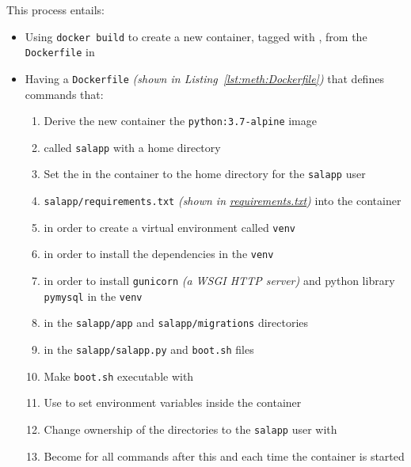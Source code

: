 \begin{enumerate}[leftmargin=0em,label=\protect\listlabelcircle{\arabic*}]
\begin{enumerate}[label=\Roman*~\textcolor{light-gray}{|}]
        This process entails:
        \begin{itemize}
          \item Using \texttt{docker build} to create a new container, tagged with , from the \texttt{Dockerfile} in 
          \item Having a \texttt{Dockerfile} \textit{(shown in Listing~\ref{lst:meth:Dockerfile})} that defines commands that:
            \begin{enumerate}[label=\textcolor{deep-gray}{\roman*\textasciitilde}]
              \item Derive the new container  the \texttt{python:3.7-alpine} image
              \item {} called \texttt{salapp} with a home directory
              \item Set the  in the container to the home directory for the \texttt{salapp} user
              \item {} \texttt{salapp/requirements.txt} \textit{(shown in \hyperref[fcl:uswacs-2-iy2d502-salapp:requirements.txt]{requirements.txt})} into the container
              \item {} in order to create a virtual environment called \texttt{venv}
              \item {} in order to install the dependencies in the \texttt{venv}
              \item {} in order to install \texttt{gunicorn} \textit{(a WSGI HTTP server)} and python library \texttt{pymysql} in the \texttt{venv}
              \item {} in the \texttt{salapp/app} and \texttt{salapp/migrations} directories
              \item {} in the \texttt{salapp/salapp.py} and \texttt{boot.sh} files
              \item Make \texttt{boot.sh} executable with 
              \item Use  to set environment variables inside the container
              \item Change ownership of the directories to the \texttt{salapp} user with 
              \item Become  for all commands after this and each time the container is started

\end{enumerate}
\end{itemize}
\end{enumerate}
\end{enumerate}
